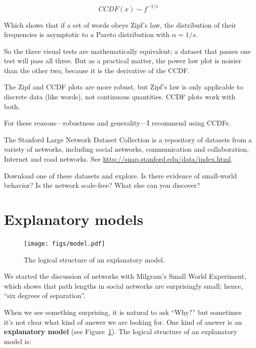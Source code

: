 \documentclass[10pt]{book}
\begin{document}
\[ CCDF(x) \sim f^{-{1/s}} \]

Which shows that if a set of words obeys Zipf's law, the
distribution of their frequencies is asymptotic to a
Pareto distribution with $\alpha = 1/s$.

So the three visual tests are mathematically equivalent; a dataset
that passes one test will pass all three.  But as a practical
matter, the power law plot is noisier than the other two, because
it is the derivative of the CCDF.

The Zipf and CCDF plots are more robust, but Zipf's law is only
applicable to discrete data (like words), not continuous quantities.
CCDF plots work with both.

For these reasons---robustness and generality---I recommend
using CCDFs.


\begin{exercise}

The Stanford Large Network Dataset Collection is a repository of
datasets from a variety of networks, including social networks,
communication and collaboration, Internet and road networks.
See \url{http://snap.stanford.edu/data/index.html}.

Download one of these datasets and explore.  Is there evidence
of small-world behavior?  Is the network scale-free?  What else
can you discover?

\end{exercise}


\section{Explanatory models}
\label{model1}

\begin{figure}
\centerline{\texttt{[image: figs/model.pdf]}}
\caption{The logical structure of an explanatory model.\label{fig.model}}
\end{figure}

We started the discussion of networks with Milgram's Small World
Experiment, which shows that path lengths in social
networks are surprisingly small; hence, ``six degrees of separation''.

When we see something surprising, it is natural to ask ``Why?''  but
sometimes it's not clear what kind of answer we are looking for.  One
kind of answer is an {\bf explanatory model} (see
Figure~\ref{fig.model}).  The logical structure of an explanatory
model is: 
\end{document}
